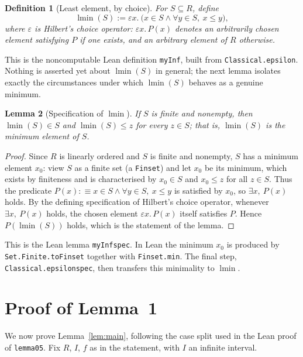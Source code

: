 \documentclass[11pt]{article}
\newtheorem{definition}{Definition}[section]
\newtheorem{lemma}[definition]{Lemma}
\newcommand{\Lean}[1]{\texttt{\begingroup\def\_{\textunderscore\discretionary{}{}{}}#1\endgroup}}
\newcommand{\lmin}{\operatorname{lmin}}
\begin{document}
\begin{definition}[Least element, by choice]
For $S\subseteq R$, define
\[
  \lmin(S) := \varepsilon x.\ \bigl(x\in S \wedge \forall y\in S,\ x\le y\bigr),
\]
where $\varepsilon$ is Hilbert's choice operator: $\varepsilon x.\,P(x)$ denotes an arbitrarily
chosen element satisfying $P$ if one exists, and an arbitrary element of $R$ otherwise.
\end{definition}
 
This is the noncomputable Lean definition \Lean{myInf}, built from \Lean{Classical.epsilon}.
Nothing is asserted yet about $\lmin(S)$ in general; the next lemma isolates exactly the
circumstances under which $\lmin(S)$ behaves as a genuine minimum.
 
\begin{lemma}[Specification of $\lmin$]\label{lem:myinf-spec}
If $S$ is finite and nonempty, then $\lmin(S)\in S$ and $\lmin(S)\le z$ for every $z\in S$; that
is, $\lmin(S)$ is the minimum element of $S$.
\end{lemma}
 
\begin{proof}
Since $R$ is linearly ordered and $S$ is finite and nonempty, $S$ has a minimum element $x_0$: view
$S$ as a finite set (a \Lean{Finset}) and let $x_0$ be its minimum, which exists by finiteness and
is characterised by $x_0\in S$ and $x_0\le z$ for all $z\in S$. Thus the predicate
$P(x):\equiv x\in S\wedge\forall y\in S,\ x\le y$ is satisfied by $x_0$, so $\exists x,\ P(x)$ holds.
By the defining specification of Hilbert's choice operator, whenever $\exists x,\ P(x)$ holds, the
chosen element $\varepsilon x.\,P(x)$ itself satisfies $P$. Hence $P(\lmin(S))$ holds, which is the
statement of the lemma.
\end{proof}
 
\begin{raggedright}
This is the Lean lemma \Lean{myInf\_spec}. In Lean the minimum $x_0$ is produced by
\Lean{Set.Finite.toFinset} together with \Lean{Finset.min\textquotesingle}. The final step,
\Lean{Classical.epsilon\_spec}, then transfers this minimality to $\lmin$.
\end{raggedright}
 
\section{Proof of Lemma~1}\label{sec:proof}
 
We now prove Lemma~\ref{lem:main}, following the case split used in the Lean proof of
\Lean{lemma\_0\_5}. Fix $R$, $I$, $f$ as in the statement, with $I$ an infinite interval.
 
\end{document}
